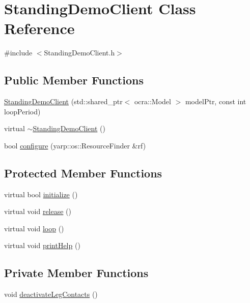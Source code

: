 \hypertarget{classStandingDemoClient}{\section{\-Standing\-Demo\-Client \-Class \-Reference}
\label{classStandingDemoClient}
}


{\ttfamily \#include $<$\-Standing\-Demo\-Client.\-h$>$}

\subsection*{\-Public \-Member \-Functions}
\begin{DoxyCompactItemize}
\item 
\hyperlink{classStandingDemoClient_a7fc81439cf274825e81f243fab4ee94a}{\-Standing\-Demo\-Client} (std\-::shared\-\_\-ptr$<$ ocra\-::\-Model $>$ model\-Ptr, const int loop\-Period)
\item 
virtual \hyperlink{classStandingDemoClient_a36afdcb86f9e304c53f9903d6b286dd7}{$\sim$\-Standing\-Demo\-Client} ()
\item 
bool \hyperlink{classStandingDemoClient_a9cca697399c183d9e2e5fe5b45dbc815}{configure} (yarp\-::os\-::\-Resource\-Finder \&rf)
\end{DoxyCompactItemize}
\subsection*{\-Protected \-Member \-Functions}
\begin{DoxyCompactItemize}
\item 
virtual bool \hyperlink{classStandingDemoClient_a0219c4ae161543b6ea797f27f345593c}{initialize} ()
\item 
virtual void \hyperlink{classStandingDemoClient_abdc4f3642b1ab31ba16375e55a7a68f4}{release} ()
\item 
virtual void \hyperlink{classStandingDemoClient_a294411fb3f128a6a8f5011ea6330af6e}{loop} ()
\item 
virtual void \hyperlink{classStandingDemoClient_ae1f321428f6b67b2f8bf7e1e7a1cd3d4}{print\-Help} ()
\end{DoxyCompactItemize}
\subsection*{\-Private \-Member \-Functions}
\begin{DoxyCompactItemize}
\item 
void \hyperlink{classStandingDemoClient_a6a16f7c8b66d49c6fc63f75ce8eaaf0b}{deactivate\-Leg\-Contacts} ()
\end{DoxyCompactItemize}
